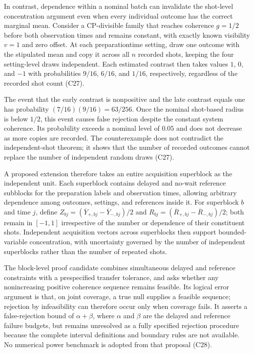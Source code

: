 \documentclass[11pt]{article}
\begin{document}
In contrast, dependence within a nominal batch can invalidate the shot-level concentration argument even when every individual outcome has the correct marginal mean. Consider a CP-divisible family that reaches coherence $g=1/2$ before both observation times and remains constant, with exactly known visibility $v=1$ and zero offset. At each preparation\textendash{}time setting, draw one outcome with the stipulated mean and copy it across all $n$ recorded shots, keeping the four setting-level draws independent. Each estimated contrast then takes values $1$, $0$, and $-1$ with probabilities $9/16$, $6/16$, and $1/16$, respectively, regardless of the recorded shot count (C27).

The event that the early contrast is nonpositive and the late contrast equals one has probability $(7/16)(9/16)=63/256$. Once the nominal shot-based radius is below $1/2$, this event causes false rejection despite the constant system coherence. Its probability exceeds a nominal level of $0.05$ and does not decrease as more copies are recorded. The counterexample does not contradict the independent-shot theorem; it shows that the number of recorded outcomes cannot replace the number of independent random draws (C27).

A proposed extension therefore takes an entire acquisition superblock as the independent unit. Each superblock contains delayed and no-wait reference subblocks for the preparation labels and observation times, allowing arbitrary dependence among outcomes, settings, and references inside it. For superblock $b$ and time $j$, define $Z_{bj}=(\overline Y_{+,bj}-\overline Y_{-,bj})/2$ and $R_{bj}=(\overline R_{+,bj}-\overline R_{-,bj})/2$; both remain in $[-1,1]$ irrespective of the number or dependence of their constituent shots. Independent acquisition vectors across superblocks then support bounded-variable concentration, with uncertainty governed by the number of independent superblocks rather than the number of repeated shots.

The block-level proof candidate combines simultaneous delayed and reference constraints with a prespecified transfer tolerance, and asks whether any nonincreasing positive coherence sequence remains feasible. Its logical error argument is that, on joint coverage, a true null supplies a feasible sequence; rejection by infeasibility can therefore occur only when coverage fails. It asserts a false-rejection bound of $\alpha+\beta$, where $\alpha$ and $\beta$ are the delayed and reference failure budgets, but remains unresolved as a fully specified rejection procedure because the complete interval definitions and boundary rules are not available. No numerical power benchmark is adopted from that proposal (C28).
\end{document}
